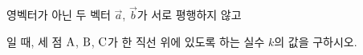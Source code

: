 영벡터가 아닌 두 벡터 $\vec{a}$, $\vec{b}$가 서로 평행하지 않고 \par\smallskip{}\par\smallskip\noindent 일 때, 세 점 $\mathrm{A}$, $\mathrm{B}$, $\mathrm{C}$가 한 직선 위에 있도록 하는 실수 $k$의 값을 구하시오.
